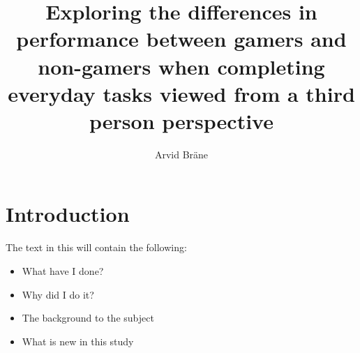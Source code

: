 \documentclass[runningheads,a4paper,oribibl]{llncs}
\begin{document}
\pagestyle{headings}

\mainmatter

\title{Exploring the differences in performance between gamers and non-gamers when completing everyday tasks viewed from a third person perspective}



\author{Arvid Bräne}


\maketitle






\section{Introduction}
The text in this will contain the following:
\begin{itemize}
	\item What have I done?
	\item Why did I do it?
	\item The background to the subject
	\item What is new in this study
\end{itemize}
\end{document}
